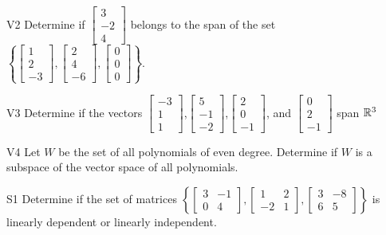 \documentclass{sbgLAexam}
\begin{document}
\begin{problem}{V2}
  Determine if
  \(\begin{bmatrix} 3 \\ -2 \\ 4 \end{bmatrix}\)
  belongs to the span of the set
  \(\left\{
    \begin{bmatrix} 1 \\ 2 \\ -3 \end{bmatrix},
    \begin{bmatrix} 2 \\ 4 \\ -6 \end{bmatrix},
    \begin{bmatrix} 0 \\ 0 \\ 0 \end{bmatrix}
    \right\}
  \).
\end{problem}
\newpage

\begin{problem}{V3}
Determine if the vectors  $\begin{bmatrix} -3 \\ 1 \\ 1 \end{bmatrix}$,$\begin{bmatrix} 5 \\ -1 \\ -2 \end{bmatrix}$,$\begin{bmatrix}2 \\ 0 \\ -1 \end{bmatrix}$, and $\begin{bmatrix} 0 \\ 2 \\ -1\end{bmatrix}$ span $\mathbb{R}^3$
\end{problem}

\begin{problem}{V4} Let $W$ be the set of all polynomials of even degree.  Determine if $W$ is a subspace of the vector space of all polynomials.
\end{problem}
\newpage

\begin{problem}{S1}
Determine if the set of matrices $\left\{\begin{bmatrix} 3 & -1 \\ 0 & 4 \end{bmatrix}, \begin{bmatrix} 1  & 2 \\ -2 & 1 \end{bmatrix}, \begin{bmatrix} 3 & -8 \\ 6 & 5 \end{bmatrix} \right\}$  is linearly dependent or linearly independent.
\end{problem}
\end{document}
